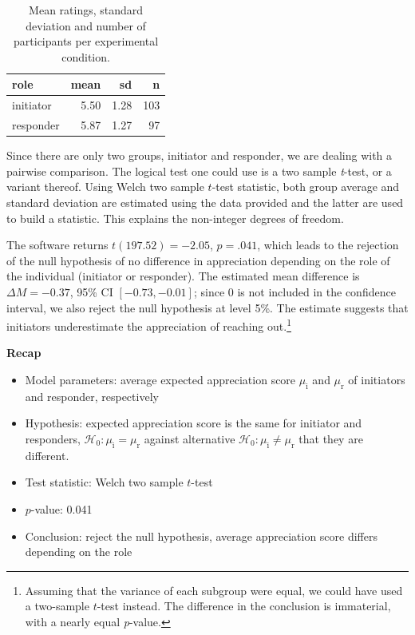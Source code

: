 \documentclass[
  11pt,
  letterpaper,
]{scrbook}
\providecommand{\tightlist}{%
  \setlength{\itemsep}{0pt}\setlength{\parskip}{0pt}}\usepackage{longtable,booktabs,array}
\theoremstyle{definition}
\theoremstyle{remark}
\begin{document}
\hypertarget{tbl-LRMMS1-summarystat-b}{}
\begin{table}
\caption{\label{tbl-LRMMS1-summarystat-b}Mean ratings, standard deviation and number of participants per
experimental condition. }\tabularnewline

\centering
\begin{tabular}{lrrr}
\toprule
role & mean & sd & n\\
\midrule
initiator & 5.50 & 1.28 & 103\\
responder & 5.87 & 1.27 & 97\\
\bottomrule
\end{tabular}
\end{table}

Since there are only two groups, initiator and responder, we are dealing
with a pairwise comparison. The logical test one could use is a two
sample \emph{t}-test, or a variant thereof. Using Welch two sample
\(t\)-test statistic, both group average and standard deviation are
estimated using the data provided and the latter are used to build a
statistic. This explains the non-integer degrees of freedom.

The software returns \(t(197.52) = -2.05\), \(p = .041\), which leads to
the rejection of the null hypothesis of no difference in appreciation
depending on the role of the individual (initiator or responder). The
estimated mean difference is \(\Delta M = -0.37\), 95\% CI
\([-0.73, -0.01]\); since \(0\) is not included in the confidence
interval, we also reject the null hypothesis at level 5\%. The estimate
suggests that initiators underestimate the appreciation of reaching
out.\footnote{Assuming that the variance of each subgroup were equal, we
  could have used a two-sample \(t\)-test instead. The difference in the
  conclusion is immaterial, with a nearly equal \emph{p}-value.}

\textbf{Recap}

\begin{itemize}
\tightlist
\item
  Model parameters: average expected appreciation score
  \(\mu_{\mathrm{i}}\) and \(\mu_{\mathrm{r}}\) of initiators and
  responder, respectively
\item
  Hypothesis: expected appreciation score is the same for initiator and
  responders, \(\mathscr{H}_0: \mu_{\mathrm{i}}=\mu_{\mathrm{r}}\)
  against alternative
  \(\mathscr{H}_0: \mu_{\mathrm{i}} \neq \mu_{\mathrm{r}}\) that they
  are different.
\item
  Test statistic: Welch two sample \(t\)-test
\item
  \(p\)-value: 0.041
\item
  Conclusion: reject the null hypothesis, average appreciation score
  differs depending on the role
\end{itemize}
\end{document}
